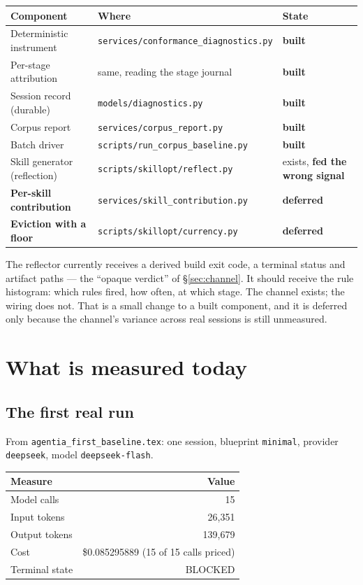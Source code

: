 \documentclass[11pt,a4paper]{article}
\begin{document}
\begin{center}
\begin{tabular}{@{}p{}p{}p{}@{}}
\toprule
\textbf{Component} & \textbf{Where} & \textbf{State} \\
\midrule
Deterministic instrument & \texttt{services/conformance\_diagnostics.py} & \textbf{built} \\
Per-stage attribution & same, reading the stage journal & \textbf{built} \\
Session record (durable) & \texttt{models/diagnostics.py} & \textbf{built} \\
Corpus report & \texttt{services/corpus\_report.py} & \textbf{built} \\
Batch driver & \texttt{scripts/run\_corpus\_baseline.py} & \textbf{built} \\
Skill generator (reflection) & \texttt{scripts/skillopt/reflect.py} & exists, \textbf{fed the wrong signal} \\
\textbf{Per-skill contribution} & \texttt{services/skill\_contribution.py} & \textbf{deferred} \\
\textbf{Eviction with a floor} & \texttt{scripts/skillopt/currency.py} & \textbf{deferred} \\
\bottomrule
\end{tabular}
\end{center}

The reflector currently receives a derived build exit code, a terminal status and
artifact paths --- the ``opaque verdict'' of \S\ref{sec:channel}. It should receive
the rule histogram: which rules fired, how often, at which stage. The channel
exists; the wiring does not. That is a small change to a built component, and it is
deferred only because the channel's variance across real sessions is still
unmeasured.

\section{What is measured today}
\label{sec:measured}

\subsection{The first real run}

From \texttt{agentia\_first\_baseline.tex}: one session, blueprint \texttt{minimal},
provider \texttt{deepseek}, model \texttt{deepseek-flash}.

\begin{center}
\begin{tabular}{@{}lr@{}}
\toprule
\textbf{Measure} & \textbf{Value} \\
\midrule
Model calls & 15 \\
Input tokens & 26{,}351 \\
Output tokens & 139{,}679 \\
Cost & \$0.085295889 \quad (15 of 15 calls priced) \\
Terminal state & BLOCKED \\
\bottomrule
\end{tabular}
\end{center}
\end{document}
